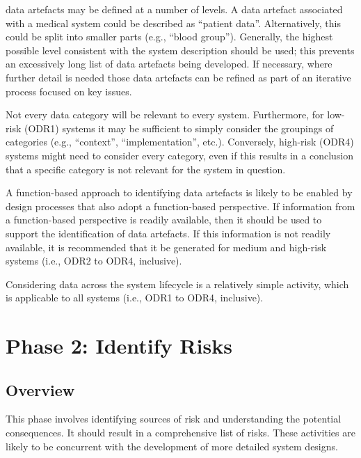 \Glspl{data artefact} may be defined at a number of levels. A \gls{data artefact} associated with a medical system could be described as ``patient data''. Alternatively, this could be split into smaller parts (e.g., ``blood group''). Generally, the highest possible level consistent with the system description should be used; this prevents an excessively long list of \glspl{data artefact} being developed. If necessary, where further detail is needed those \glspl{data artefact} can be refined as part of an iterative process focused on key issues.

Not every data category will be relevant to every system. Furthermore, for low-risk (ODR1) systems it may be sufficient to simply consider the groupings of categories (e.g., ``context'', ``implementation'', etc.). Conversely, high-risk (ODR4) systems might need to consider every category, even if this results in a conclusion that a specific category is not relevant for the system in question.

A function-based approach to identifying \glspl{data artefact} is likely to be enabled by design processes that also adopt a function-based perspective. If \gls{information} from a function-based perspective is readily available, then it should be used to support the identification of \glspl{data artefact}. If this \gls{information} is not readily available, it is recommended that it be generated for medium and high-risk systems (i.e., ODR2 to ODR4, inclusive).

Considering data across the system lifecycle is a relatively simple activity, which is applicable to all systems (i.e., ODR1 to ODR4, inclusive).

\clearpage
\section{Phase 2: Identify Risks}\label{bkm:identifyrisks}
\subsection{Overview}
This phase involves identifying sources of risk and understanding the potential consequences. It should result in a comprehensive list of risks. These activities are likely to be concurrent with the development of more detailed system designs.

